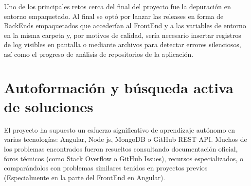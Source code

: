 Uno de los principales retos cerca del final del proyecto fue la depuración en entorno empaquetado. Al final se optó por lanzar las releases en forma de BackEnds empaquetados que accederían al FrontEnd y a las variables de entorno en la misma carpeta y, por motivos de calidad, sería necesario insertar registros de log visibles en pantalla o mediante archivos para detectar errores silenciosos, así como el progreso de análisis de repositorios de la aplicación.

\section{Autoformación y búsqueda activa de soluciones}

El proyecto ha supuesto un esfuerzo significativo de aprendizaje autónomo en varias tecnologías: Angular, Node js, MongoDB o GitHub REST API. Muchos de los problemas encontrados fueron resueltos consultando documentación oficial, foros técnicos (como Stack Overflow o GitHub Issues), recursos especializados, o comparándolos con problemas similares tenidos en proyectos previos (Especialmente en la parte del FrontEnd en Angular).

